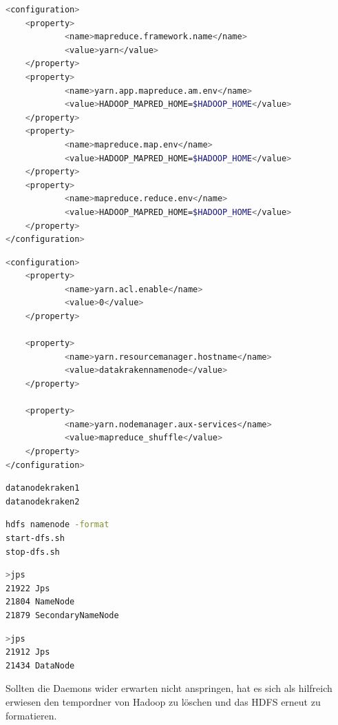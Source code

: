 \documentclass[12pt,oneside,a4paper,parskip]{scrbook}
\begin{document}
\begin{lstlisting}[caption=/hadoop/etc/hadoop/mapred-site.xml,label=mapredsitexml,language=bash]
<configuration>
    <property>
            <name>mapreduce.framework.name</name>
            <value>yarn</value>
    </property>
    <property>
            <name>yarn.app.mapreduce.am.env</name>
            <value>HADOOP_MAPRED_HOME=$HADOOP_HOME</value>
    </property>
    <property>
            <name>mapreduce.map.env</name>
            <value>HADOOP_MAPRED_HOME=$HADOOP_HOME</value>
    </property>
    <property>
            <name>mapreduce.reduce.env</name>
            <value>HADOOP_MAPRED_HOME=$HADOOP_HOME</value>
    </property>
</configuration>
\end{lstlisting}
\begin{lstlisting}[caption=/hadoop/etc/hadoop/yarn-site.xml,label=yarnsitexml,language=bash]
<configuration>
    <property>
            <name>yarn.acl.enable</name>
            <value>0</value>
    </property>

    <property>
            <name>yarn.resourcemanager.hostname</name>
            <value>datakrakennamenode</value>
    </property>

    <property>
            <name>yarn.nodemanager.aux-services</name>
            <value>mapreduce_shuffle</value>
    </property>
</configuration>

\end{lstlisting}
\begin{lstlisting}[caption=/hadoop/etc/hadoop/workers,label=workers,language=bash]
datanodekraken1
datanodekraken2
\end{lstlisting}
\begin{lstlisting}[caption=Formatieren des HDFS und Start/Stop,label=start,language=bash]
hdfs namenode -format
start-dfs.sh
stop-dfs.sh
\end{lstlisting}
\begin{lstlisting}[caption= Überprüfen von Betrieb auf Namenode,label=jpsnamenode,language=bash] %hier noch orginal von cmd einfügen
>jps
21922 Jps
21804 NameNode
21879 SecondaryNameNode
\end{lstlisting}
\begin{lstlisting}[caption=Überprüfen von Betrieb auf Workernodes,label=jpsworker,language=bash]
>jps
21912 Jps
21434 DataNode
\end{lstlisting}
Sollten die Daemons wider erwarten nicht anspringen, hat es sich als hilfreich erwiesen den tempordner von Hadoop zu löschen und das HDFS erneut zu formatieren.
\end{document}
